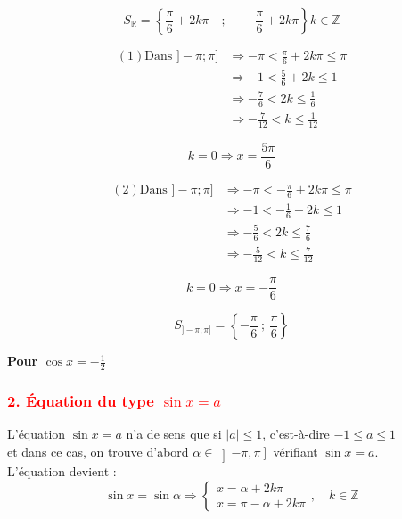 \documentclass[a4paper,12pt]{article}
\begin{document}
\[ S_{\mathbb{R}} =
    \left\{ \frac{\pi}{6} + 2k\pi \quad;\quad -\frac{\pi}{6} + 2k\pi \right\} k\in \mathbb{Z} \]

\[
    \begin{aligned}
        (1)\text{Dans } ]-\pi; \pi] & \Rightarrow-\pi < \frac{\pi}{6} + 2k\pi \leq \pi \\
                                    & \Rightarrow -1 < \frac{5}{6} + 2k \leq 1         \\
                                    & \Rightarrow -\frac{7}{6} < 2k \leq \frac{1}{6}   \\
                                    & \Rightarrow -\frac{7}{12} < k \leq \frac{1}{12}
    \end{aligned}
\]

\[
    k = 0 \Rightarrow x = \frac{5\pi}{6}
\]

\[
    \begin{aligned}
        (2)\text{Dans } ]-\pi; \pi] & \Rightarrow-\pi < -\frac{\pi}{6} + 2k\pi \leq \pi \\
                                    & \Rightarrow -1 < -\frac{1}{6} + 2k \leq 1         \\
                                    & \Rightarrow -\frac{5}{6} < 2k \leq \frac{7}{6}    \\
                                    & \Rightarrow -\frac{5}{12} < k \leq \frac{7}{12}
    \end{aligned}
\]

\[
    k = 0 \Rightarrow x = -\frac{\pi}{6}
\]

\[
    \boxed{S_{]-\pi;\pi]} = \left\{ -\frac{\pi}{6} \ ;\ \frac{\pi}{6} \right\}}
\]

\textbf{\underline{Pour $\cos x = -\frac{1}{2}$}}

\subsubsection*{\underline{\textcolor{red}{2. Équation du type $\sin x = a$}}}

L'équation $\sin x = a$ n'a de sens que si $\lvert a \rvert \leq 1$, c'est-à-dire $-1 \leq a \leq 1$ \\
et dans ce cas, on trouve d'abord \( \alpha \in \left]-\pi, \pi\right] \) vérifiant \( \sin x = a \).\\

L'équation devient :
\[
    \sin x = \sin \alpha \Rightarrow
    \begin{cases}
        x = \alpha + 2k\pi \\
        x = \pi - \alpha + 2k\pi
    \end{cases},\quad k \in \mathbb{Z}
\]
\end{document}
